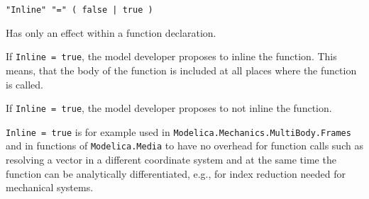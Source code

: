 \begin{annotationdefinition}[Inline]
\begin{synopsis}[grammar]\begin{lstlisting}
"Inline" "=" ( false | true )
\end{lstlisting}\end{synopsis}
\begin{semantics}
Has only an effect within a function declaration.

If \lstinline!Inline = true!, the model developer proposes to inline the function.  This means, that the body of the function is included at all places where the function is called.

If \lstinline!Inline = true!, the model developer proposes to not inline the function.

\begin{nonnormative}
\lstinline!Inline = true! is for example used in \lstinline!Modelica.Mechanics.MultiBody.Frames! and in functions of \lstinline!Modelica.Media! to have no overhead for function calls such as resolving a vector in a different coordinate system and at the same time the function can be analytically differentiated, e.g., for index reduction needed for mechanical systems.
\end{nonnormative}
\end{semantics}
\end{annotationdefinition}

